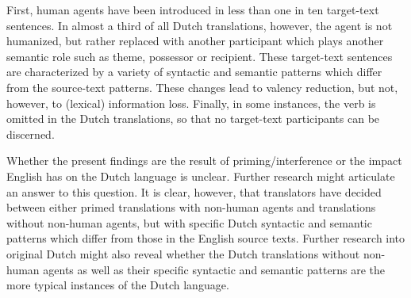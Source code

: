 \documentclass[output=paper]{LSP/langsci}
\begin{document}
First, human agents have been introduced in less than one in ten target-text sentences. In almost a third of all Dutch translations, however, the agent is not humanized, but rather replaced with another participant which plays another semantic role such as theme, possessor or recipient. These target-text sentences are characterized by a variety of syntactic and semantic patterns which differ from the source-text patterns. These changes lead to valency reduction, but not, however, to (lexical) information loss. Finally, in some instances, the verb is omitted in the Dutch translations, so that no target-text participants can be discerned. 

Whether the present findings are the result of priming/interference or the impact English has on the Dutch language \citep[see e.g.][]{House2008,Delsoir2011} is unclear. Further research might articulate an answer to this question. It is clear, however, that translators have decided between either primed translations with non-human agents and translations without non-human agents, but with specific Dutch syntactic and semantic patterns which differ from those in the English source texts. Further research into original Dutch might also reveal whether the Dutch translations without non-human agents as well as their specific syntactic and semantic patterns are the more typical instances of the Dutch language.            

\printbibliography[heading=subbibliography,notkeyword=this]
\end{document}
